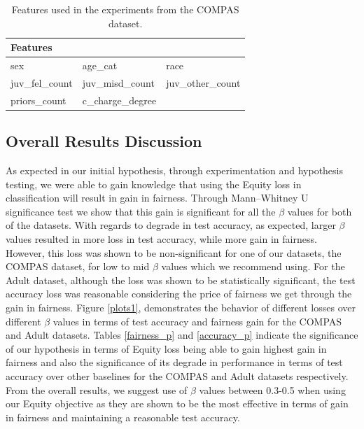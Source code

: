 \begin{table}[h]
\begin{tabular}{ p{2.3cm} p{2.3cm} p{2cm}}
 \toprule
 Features&&\\
 \midrule
 sex&age\_cat&race  \\
 juv\_fel\_count&juv\_misd\_count&juv\_other\_count\\
 priors\_count&c\_charge\_degree&\\[0.5pt]
  \bottomrule
\end{tabular}
\caption{Features used in the experiments from the COMPAS dataset.}
    \label{compas_features}
\end{table}

\subsection{Overall Results Discussion}
As expected in our initial hypothesis, through experimentation and hypothesis testing, we were able to gain knowledge that using the Equity loss in classification will result in gain in fairness. Through Mann–Whitney U significance test we show that this gain is significant for all the $\beta$ values for both of the datasets. With regards to degrade in test accuracy, as expected, larger $\beta$ values resulted in more loss in test accuracy, while more gain in fairness. However, this loss was shown to be non-significant for one of our datasets, the COMPAS dataset, for low to mid $\beta$ values which we recommend using. For the Adult dataset, although the loss was shown to be statistically significant, the test accuracy loss was reasonable considering the price of fairness we get through the gain in fairness. Figure \ref{plots1}, demonstrates the behavior of different losses over different $\beta$ values in terms of test accuracy and fairness gain for the COMPAS and Adult datasets. Tables \ref{fairness_p} and \ref{accuracy_p} indicate the significance of our hypothesis in terms of Equity loss being able to gain highest gain in fairness and also the significance of its degrade in performance in terms of test accuracy over other baselines for the COMPAS and Adult datasets respectively. From the overall results, we suggest use of $\beta$ values between 0.3-0.5 when using our Equity objective as they are shown to be the most effective in terms of gain in fairness and maintaining a reasonable test accuracy. 

